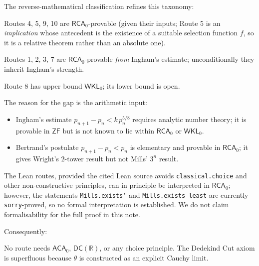 \documentclass[11pt,reqno]{amsart}
\providecommand{\R}{\mathbb{R}}
\theoremstyle{redplain}
\numberwithin{equation}{section}
\begin{document}
\noindent The reverse-mathematical classification refines this taxonomy:

Routes 4, 5, 9, 10 are $\mathsf{RCA}_0$-provable (given their inputs;
Route 5 is an \emph{implication} whose antecedent is the existence of a
suitable selection function $f$, so it is a relative theorem rather than
an absolute one).

Routes 1, 2, 3, 7 are $\mathsf{RCA}_0$-provable \emph{from} Ingham's
estimate; unconditionally they inherit Ingham's strength.

Route 8 has upper bound $\mathsf{WKL}_0$; its lower bound is open.

\noindent The reason for the gap is the arithmetic input:

\begin{itemize}
\item Ingham's estimate $p_{n+1}-p_n<k\,p_n^{5/8}$ \cite{Ingham1937}
      requires analytic number theory; it is provable in $\mathsf{ZF}$ but
      is not known to lie within $\mathsf{RCA}_0$ or $\mathsf{WKL}_0$.
\item Bertrand's postulate $p_{n+1}-p_n<p_n$ \cite{HardyWright1960} is
      elementary and provable in $\mathsf{RCA}_0$; it gives Wright's
      $2$-tower result but not Mills' $3^n$ result.
\end{itemize}

\noindent The Lean routes, provided the cited Lean source
\cite{FormalConjectures} avoids \texttt{classical.choice} and other
non-constructive principles, can in principle be interpreted in
$\mathsf{RCA}_0$; however, the statements \texttt{Mills.exists'} and
\texttt{Mills.exists\_least} are currently \texttt{sorry}-proved, so no
formal interpretation is established. We do not claim formalisability for
the full proof in this note.

\noindent Consequently:

\begin{center}
\end{center}

\noindent No route needs $\mathsf{ACA}_0$, $\mathsf{DC}(\R)$, or any
choice principle. The Dedekind Cut axiom is superfluous because $\theta$
is constructed as an explicit Cauchy limit.
\end{document}
